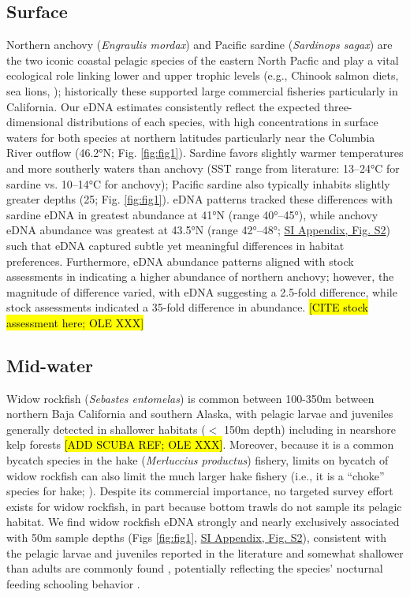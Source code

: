 \documentclass[9pt,twocolumn,twoside]{pnas-new}
\begin{document}
\subsection*{Surface}
Northern anchovy (\textit{Engraulis mordax}) and Pacific sardine (\textit{Sardinops sagax}) are the two iconic coastal pelagic species of the eastern North Pacfic \cite{steinbeck1945} and play a vital ecological role linking lower and upper trophic levels (e.g., Chinook salmon diets, sea lions, \cite{kaplan2019}); historically these supported large commercial fisheries particularly in California. Our eDNA estimates consistently reflect the expected three-dimensional distributions of each species, with high concentrations in surface waters for both species at northern latitudes \cite{litz2008,parnel2008} particularly near the Columbia River outflow (46.2°N; Fig. \ref{fig:fig1}). Sardine favors slightly warmer temperatures and more southerly waters than anchovy (SST range from literature: 13–24°C for sardine vs. 10–14°C for anchovy); Pacific sardine also typically inhabits slightly greater depths (25; Fig. \ref{fig:fig1}). eDNA patterns tracked these differences with sardine eDNA in greatest abundance at 41°N (range 40°–45°), while anchovy eDNA abundance was greatest at 43.5°N (range 42°–48°; \href{SI_Appendix.pdf}{SI Appendix, Fig. S2}) such that eDNA captured subtle yet meaningful differences in habitat preferences. Furthermore, eDNA abundance patterns aligned with stock assessments in indicating a higher abundance of northern anchovy; however, the magnitude of difference varied, with eDNA suggesting a 2.5-fold difference, while stock assessments indicated a 35-fold difference in abundance. \hl{[CITE stock assessment here; OLE XXX]}

\subsection*{Mid-water}
Widow rockfish (\textit{Sebastes entomelas}) is common between 100-350m between northern Baja California and southern Alaska, with pelagic larvae and juveniles generally detected in shallower habitats ($<$ 150m depth) \cite{reynolds2001,bosley2014} including in nearshore kelp forests \cite{quigley2024} \hl{[ADD SCUBA REF; OLE XXX]}. Moreover, because it is a common bycatch species in the hake (\textit{Merluccius productus}) fishery, limits on bycatch of widow rockfish can also limit the much larger hake fishery (i.e., it is a “choke” species for hake; \cite{somers2018}). Despite its commercial importance, no targeted survey effort exists for widow rockfish, in part because bottom trawls do not sample its pelagic habitat. We find widow rockfish eDNA strongly and nearly exclusively associated with 50m sample depths (Figs \ref{fig:fig1}, \href{SI_Appendix.pdf}{SI Appendix, Fig. S2}), consistent with the pelagic larvae and juveniles reported in the literature and somewhat shallower than adults are commonly found \cite{reynolds2001,bosley2014,quigley2024}, potentially reflecting the species’ nocturnal feeding schooling behavior \cite{reynolds2001,bosley2014}.
\end{document}
